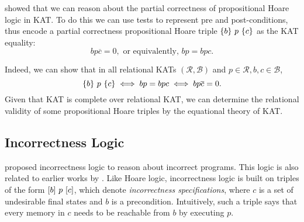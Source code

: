 \citet{Kozen_2000} showed that we can reason about the 
partial correctness of propositional Hoare logic in KAT\@. 
To do this  we can use tests to represent pre and post-conditions,
thus encode a partial correctness propositional Hoare triple
\(\{b\}~p~\{c\}\) as the KAT equality:
\[b p \overline{c} = 0, \text{ or equivalently, } b p = b p c.\]

Indeed, we can show that in all relational KATs \((ℛ, ℬ)\) and
\(p \in ℛ, b, c \in ℬ\),
\[\{b\}~p~\{c\} \iff bp = bpc \iff b p \overline{c} = 0.\]
Given that KAT is complete over relational KAT, we can determine the relational
validity of some propositional Hoare triples by the equational theory of KAT\@.

\subsection{Incorrectness Logic}
%
\citet{OHearn_2020} proposed incorrectness logic to reason about
incorrect programs.  This logic is also related to earlier works by
\citet{devries_ReverseHoareLogic_2011}.  Like Hoare logic, incorrectness logic is built on
triples of the form \([b]~p~[c]\), which denote \emph{incorrectness
  specifications}, where \(c\) is a set of undesirable final states and \(b\) is a
precondition. Intuitively, such a triple says that every memory in \(c\) needs
to be reachable from \(b\) by executing \(p\).

